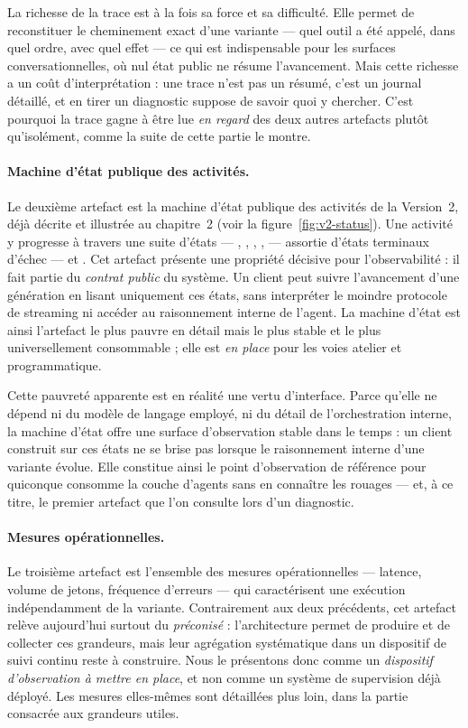 La richesse de la trace est à la fois sa force et sa difficulté. Elle
permet de reconstituer le cheminement exact d'une variante — quel
outil a été appelé, dans quel ordre, avec quel effet — ce qui est
indispensable pour les surfaces conversationnelles, où nul état public
ne résume l'avancement. Mais cette richesse a un coût d'interprétation :
une trace n'est pas un résumé, c'est un journal détaillé, et en tirer
un diagnostic suppose de savoir quoi y chercher. C'est pourquoi la
trace gagne à être lue \emph{en regard} des deux autres artefacts
plutôt qu'isolément, comme la suite de cette partie le montre.

\paragraph{Machine d'état publique des activités.}
Le deuxième artefact est la machine d'état publique des activités de
la Version~2, déjà décrite et illustrée au chapitre~2 (voir la
figure~\ref{fig:v2-status}). Une activité y progresse à travers une
suite d'états — , , ,
,  — assortie d'états terminaux
d'échec —  et . Cet artefact présente
une propriété décisive pour l'observabilité : il fait partie du
\emph{contrat public} du système. Un client peut suivre l'avancement
d'une génération en lisant uniquement ces états, sans interpréter le
moindre protocole de streaming ni accéder au raisonnement interne de
l'agent. La machine d'état est ainsi l'artefact le plus pauvre en
détail mais le plus stable et le plus universellement consommable ;
elle est \emph{en place} pour les voies atelier et programmatique.

Cette pauvreté apparente est en réalité une vertu d'interface. Parce
qu'elle ne dépend ni du modèle de langage employé, ni du détail de
l'orchestration interne, la machine d'état offre une surface
d'observation stable dans le temps : un client construit sur ces états
ne se brise pas lorsque le raisonnement interne d'une variante évolue.
Elle constitue ainsi le point d'observation de référence pour quiconque
consomme la couche d'agents sans en connaître les rouages — et, à ce
titre, le premier artefact que l'on consulte lors d'un diagnostic.

\paragraph{Mesures opérationnelles.}
Le troisième artefact est l'ensemble des mesures opérationnelles —
latence, volume de jetons, fréquence d'erreurs — qui caractérisent une
exécution indépendamment de la variante. Contrairement aux deux
précédents, cet artefact relève aujourd'hui surtout du
\emph{préconisé} : l'architecture permet de produire et de collecter
ces grandeurs, mais leur agrégation systématique dans un dispositif de
suivi continu reste à construire. Nous le présentons donc comme un
\emph{dispositif d'observation à mettre en place}, et non comme un
système de supervision déjà déployé. Les mesures elles-mêmes sont
détaillées plus loin, dans la partie consacrée aux grandeurs utiles.

